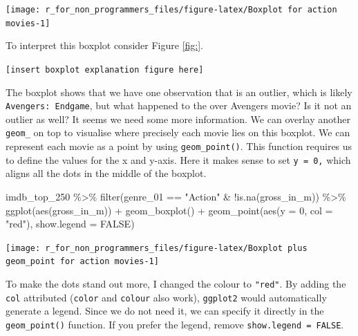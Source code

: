 \documentclass[
]{book}
\newenvironment{Shaded}{\begin{snugshade}}{\end{snugshade}}
\newcommand{\AttributeTok}[1]{\textcolor[rgb]{0.77,0.63,0.00}{#1}}
\newcommand{\ConstantTok}[1]{\textcolor[rgb]{0.00,0.00,0.00}{#1}}
\newcommand{\DecValTok}[1]{\textcolor[rgb]{0.00,0.00,0.81}{#1}}
\newcommand{\FunctionTok}[1]{\textcolor[rgb]{0.00,0.00,0.00}{#1}}
\newcommand{\NormalTok}[1]{#1}
\newcommand{\SpecialCharTok}[1]{\textcolor[rgb]{0.00,0.00,0.00}{#1}}
\newcommand{\StringTok}[1]{\textcolor[rgb]{0.31,0.60,0.02}{#1}}
\begin{document}
\begin{center}\texttt{[image: r\_for\_non\_programmers\_files/figure-latex/Boxplot for action movies-1]} \end{center}

To interpret this boxplot consider Figure \ref{fig:}.

\texttt{{[}insert\ boxplot\ explanation\ figure\ here{]}}

The boxplot shows that we have one observation that is an outlier, which is likely \texttt{Avengers:\ Endgame}, but what happened to the over Avengers movie? Is it not an outlier as well? It seems we need some more information. We can overlay another \texttt{geom\_} on top to visualise where precisely each movie lies on this boxplot. We can represent each movie as a point by using \texttt{geom\_point()}. This function requires us to define the values for the x and y-axis. Here it makes sense to set \texttt{y\ =\ 0,} which aligns all the dots in the middle of the boxplot.

\begin{Shaded}
\begin{Highlighting}[]
\NormalTok{imdb\_top\_250 }\SpecialCharTok{\%\textgreater{}\%}
  \FunctionTok{filter}\NormalTok{(genre\_01 }\SpecialCharTok{==} \StringTok{"Action"} \SpecialCharTok{\&} \SpecialCharTok{!}\FunctionTok{is.na}\NormalTok{(gross\_in\_m)) }\SpecialCharTok{\%\textgreater{}\%}
  \FunctionTok{ggplot}\NormalTok{(}\FunctionTok{aes}\NormalTok{(gross\_in\_m)) }\SpecialCharTok{+}
  \FunctionTok{geom\_boxplot}\NormalTok{() }\SpecialCharTok{+}
  \FunctionTok{geom\_point}\NormalTok{(}\FunctionTok{aes}\NormalTok{(}\AttributeTok{y =} \DecValTok{0}\NormalTok{, }\AttributeTok{col =} \StringTok{"red"}\NormalTok{), }\AttributeTok{show.legend =} \ConstantTok{FALSE}\NormalTok{)}
\end{Highlighting}
\end{Shaded}

\begin{center}\texttt{[image: r\_for\_non\_programmers\_files/figure-latex/Boxplot plus geom\_point for action movies-1]} \end{center}

To make the dots stand out more, I changed the colour to \texttt{"red"}. By adding the \texttt{col} attributed (\texttt{color} and \texttt{colour} also work), \texttt{ggplot2} would automatically generate a legend. Since we do not need it, we can specify it directly in the \texttt{geom\_point()} function. If you prefer the legend, remove \texttt{show.legend\ =\ FALSE}.
\end{document}
